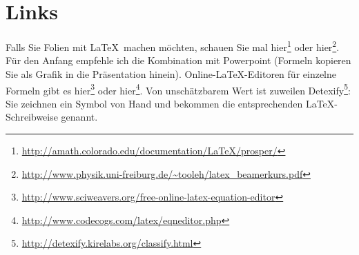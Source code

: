
\clearpage
\section{Links}

Falls Sie Folien mit \LaTeX\ machen möchten, schauen Sie mal hier\footnote{
\url{http://amath.colorado.edu/documentation/LaTeX/prosper/}} oder hier\footnote{ 
\url{http://www.physik.uni-freiburg.de/~tooleh/latex_beamerkurs.pdf}}.
Für den Anfang empfehle ich die Kombination mit Powerpoint (Formeln kopieren Sie als Grafik in die Präsentation hinein).
Online-\LaTeX-Editoren für einzelne Formeln gibt es hier\footnote{ 
\url{http://www.sciweavers.org/free-online-latex-equation-editor}}
oder hier\footnote{\url{http://www.codecogs.com/latex/eqneditor.php}}. Von unschätzbarem Wert ist zuweilen Detexify\footnote{\url{http://detexify.kirelabs.org/classify.html}}: Sie zeichnen ein Symbol von Hand und bekommen die entsprechenden \LaTeX-Schreibweise genannt.

